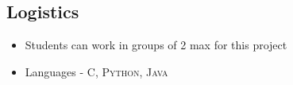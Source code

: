 \documentclass[12pt]{article}
\begin{document}
\subsection{Logistics}

\begin{itemize}
    \item Students can work in groups of 2 max for this project 
    \item Languages - \textsc{C, Python, Java}
\end{itemize}
\end{document}
